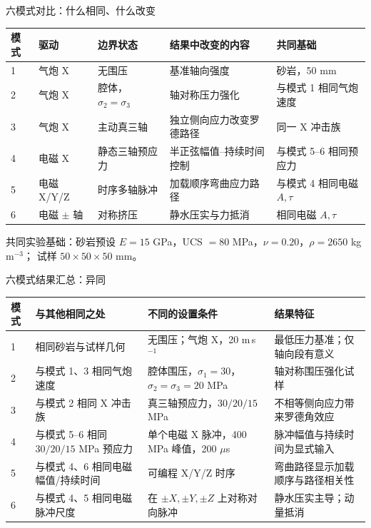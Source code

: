 \documentclass[11pt,aspectratio=169]{beamer}
\newcommand{\toprule}{\hline}
\newcommand{\midrule}{\hline}
\newcommand{\bottomrule}{\hline}
\newcommand{\cncue}[1]{{\footnotesize\color{TUSTmidgray} #1}}
\begin{document}
\begin{frame}{六模式对比：什么相同、什么改变}
  \tiny
  \begin{tabular}{@{}p{}p{}p{}p{}p{}@{}}
    \toprule
    \textbf{模式} & \textbf{驱动} & \textbf{边界状态} & \textbf{结果中改变的内容} & \textbf{共同基础} \\
    \midrule
    1 & 气炮 X & 无围压 & 基准轴向强度 & 砂岩，50 mm \\
    2 & 气炮 X & 腔体，$\sigma_2=\sigma_3$ & 轴对称压力强化 & 与模式 1 相同气炮速度 \\
    3 & 气炮 X & 主动真三轴 & 独立侧向应力改变罗德路径 & 同一 X 冲击族 \\
    4 & 电磁 X & 静态三轴预应力 & 半正弦幅值--持续时间控制 & 与模式 5--6 相同预应力 \\
    5 & 电磁 X/Y/Z & 时序多轴脉冲 & 加载顺序弯曲应力路径 & 与模式 4 相同电磁 $A,\tau$ \\
    6 & 电磁 $\pm$ 轴 & 对称挤压 & 静水压实与力抵消 & 相同电磁 $A,\tau$ \\
    \bottomrule
  \end{tabular}
  \vspace{0.16cm}
  \cncue{共同实验基础：砂岩预设
  $E=15$ GPa，UCS $=80$ MPa，$\nu=0.20$，$\rho=2650$ kg\,m$^{-3}$；
  试样 $50\times50\times50$ mm。}
\end{frame}

\begin{frame}{六模式结果汇总：异同}
  \scriptsize
  \begin{tabular}{@{}p{}p{}p{}p{}@{}}
    \toprule
    \textbf{模式} & \textbf{与其他相同之处} & \textbf{不同的设置条件} & \textbf{结果特征} \\
    \midrule
    1 & 相同砂岩与试样几何 & 无围压；气炮 X，20 m\,s$^{-1}$ & 最低压力基准；仅轴向段有意义 \\
    2 & 与模式 1、3 相同气炮速度 & 腔体围压，$\sigma_1=30$，$\sigma_2=\sigma_3=20$ MPa & 轴对称围压强化试样 \\
    3 & 与模式 2 相同 X 冲击族 & 真三轴预应力，$30/20/15$ MPa & 不相等侧向应力带来罗德角效应 \\
    4 & 与模式 5--6 相同 $30/20/15$ MPa 预应力 & 单个电磁 X 脉冲，400 MPa 峰值，200 $\mu$s & 脉冲幅值与持续时间为显式输入 \\
    5 & 与模式 4、6 相同电磁幅值/持续时间 & 可编程 X/Y/Z 时序 & 弯曲路径显示加载顺序与路径相关性 \\
    6 & 与模式 4、5 相同电磁脉冲尺度 & 在 $\pm X,\pm Y,\pm Z$ 上对称对向脉冲 & 静水压实主导；动量抵消 \\
    \bottomrule
  \end{tabular}
\end{frame}
\end{document}
